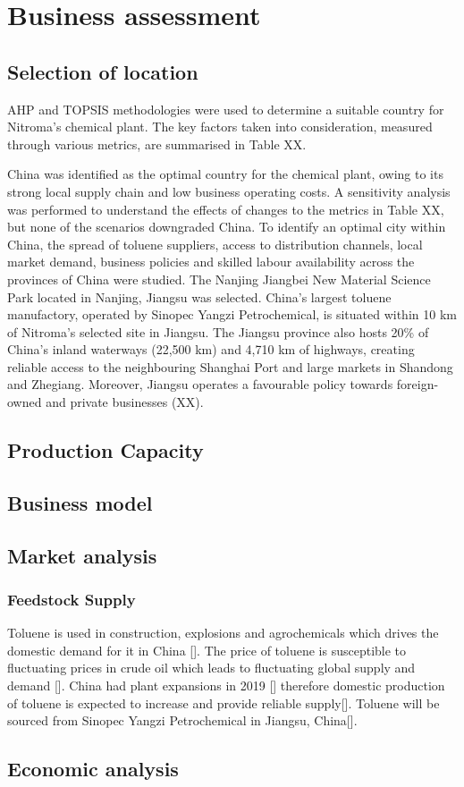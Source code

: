\section{Business assessment}
\label{sec:economics}
\subsection{Selection of location} 
AHP and TOPSIS methodologies were used to determine a suitable country for Nitroma’s chemical plant. The key factors taken into consideration, measured through various metrics, are summarised in Table XX.

China was identified as the optimal country for the chemical plant, owing to its strong local supply chain and low business operating costs. A sensitivity analysis was performed to understand the effects of changes to the metrics in Table XX, but none of the scenarios downgraded China. To identify an optimal city within China, the spread of toluene suppliers, access to distribution channels, local market demand, business policies and skilled labour availability across the provinces of China were studied. The Nanjing Jiangbei New Material Science Park located in Nanjing, Jiangsu was selected. China’s largest toluene manufactory, operated by Sinopec Yangzi Petrochemical, is situated within 10 km of Nitroma’s selected site in Jiangsu. The Jiangsu province also hosts 20\% of China’s inland waterways (22,500 km) and 4,710 km of highways, creating reliable access to the neighbouring Shanghai Port and large markets in Shandong and Zhegiang. Moreover, Jiangsu operates a favourable policy towards foreign-owned and private businesses (XX). 

\subsection{Production Capacity}


\subsection{Business model} 

\subsection{Market analysis}

\subsubsection{Feedstock Supply}
Toluene is used in construction, explosions and agrochemicals which drives the domestic demand for it in China []. The price of toluene is susceptible to fluctuating prices in crude oil which leads to fluctuating global supply and demand []. China had plant expansions in 2019 [] therefore domestic production of toluene is expected to increase and provide reliable supply[]. Toluene will be sourced from Sinopec Yangzi Petrochemical in Jiangsu, China[].

\subsection{Economic analysis} 